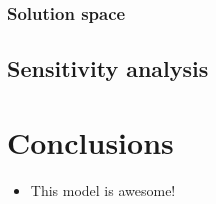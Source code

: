 \documentclass{wscpaperproc}
\begin{document}
\subsubsection{Solution space}

\subsection{Sensitivity analysis}

\section{Conclusions}

\begin{itemize}
    \item This model is awesome!
\end{itemize}



\end{document}
